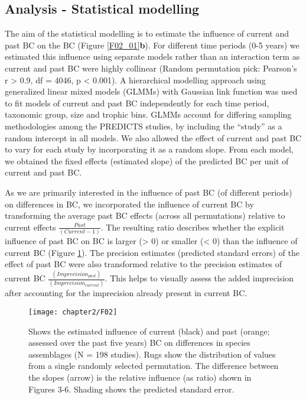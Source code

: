 \subsection{Analysis - Statistical modelling}
The aim of the statistical modelling is to estimate the influence of current and past BC on the BC (Figure \ref{F02_01}\textbf{b}). For different time periods (0-5 years) we estimated this influence using separate models rather than an interaction term as current and past BC were highly collinear (Random permutation pick: Pearson’s r > 0.9, df = 4046, p < 0.001). A hierarchical modelling approach using generalized linear mixed models (GLMMs) with Gaussian link function was used to fit models of current and past BC independently for each time period, taxonomic group, size and trophic bins. GLMMs account for differing sampling methodologies among the PREDICTS studies, by including the “study” as a random intercept in all models. We also allowed the effect of current and past BC to vary for each study by incorporating it as a random slope. From each model, we obtained the fixed effects (estimated slope) of the predicted BC per unit of current and past BC.
	
As we are primarily interested in the influence of past BC (of different periods) on differences in BC, we incorporated the influence of current BC by transforming the average past BC effects (across all permutations) relative to current effects $\frac{Past}{(Current - 1)}$. The resulting ratio describes whether the explicit influence of past BC on BC is larger (> 0) or smaller (< 0) than the influence of current BC (Figure \ref{F02_02}). The precision estimates (predicted standard errors) of the effect of past BC were also transformed relative to the precision estimates of current BC $\frac{(Imprecision_{past})}{(Imprecision_{current})}$. This helps to visually assess the added imprecision after accounting for the imprecision already present in current BC. 

\begin{figure}[h]
\centering
\texttt{[image: chapter2/F02]}
\caption{Shows the estimated influence of current (black) and past (orange; assessed over the past five years) BC on differences in species assemblages (N = 198 studies). Rugs show the distribution of values from a single randomly selected permutation. The difference between the slopes (arrow) is the relative influence (as ratio) shown in Figures 3-6. Shading shows the predicted standard error.}
\label{F02_02}
\end{figure}

